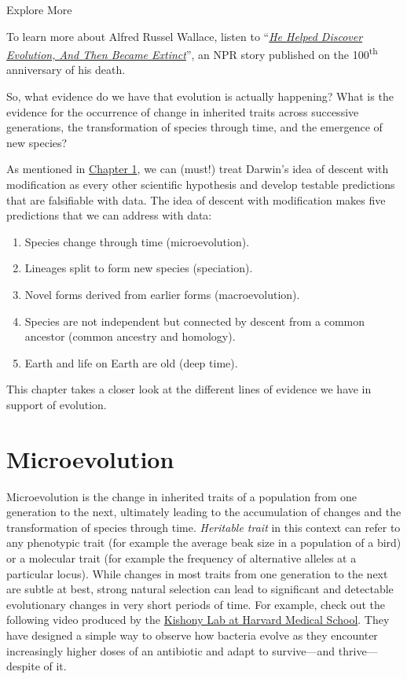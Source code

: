 \documentclass[
]{book}
\providecommand{\tightlist}{%
  \setlength{\itemsep}{0pt}\setlength{\parskip}{0pt}}
\begin{document}
Explore More

To learn more about Alfred Russel Wallace, listen to ``\href{https://www.npr.org/2013/04/30/177781424/he-helped-discover-evolution-and-then-became-extinct}{\emph{He Helped Discover Evolution, And Then Became Extinct}}'', an NPR story published on the 100\textsuperscript{th} anniversary of his death.

So, what evidence do we have that evolution is actually happening? What is the evidence for the occurrence of change in inherited traits across successive generations, the transformation of species through time, and the emergence of new species?

As mentioned in \href{what-evolution-is.html\#predictions}{Chapter 1}, we can (must!) treat Darwin's idea of descent with modification as every other scientific hypothesis and develop testable predictions that are falsifiable with data. The idea of descent with modification makes five predictions that we can address with data:

\begin{enumerate}
\def\labelenumi{\arabic{enumi}.}
\tightlist
\item
  Species change through time (microevolution).
\item
  Lineages split to form new species (speciation).
\item
  Novel forms derived from earlier forms (macroevolution).
\item
  Species are not independent but connected by descent from a common ancestor (common ancestry and homology).
\item
  Earth and life on Earth are old (deep time).
\end{enumerate}

This chapter takes a closer look at the different lines of evidence we have in support of evolution.

\hypertarget{microevolution}{%
\section{Microevolution}\label{microevolution}}

Microevolution is the change in inherited traits of a population from one generation to the next, ultimately leading to the accumulation of changes and the transformation of species through time. \emph{Heritable trait} in this context can refer to any phenotypic trait (for example the average beak size in a population of a bird) or a molecular trait (for example the frequency of alternative alleles at a particular locus). While changes in most traits from one generation to the next are subtle at best, strong natural selection can lead to significant and detectable evolutionary changes in very short periods of time. For example, check out the following video produced by the \href{https://kishony.technion.ac.il/}{Kishony Lab at Harvard Medical School}. They have designed a simple way to observe how bacteria evolve as they encounter increasingly higher doses of an antibiotic and adapt to survive---and thrive---despite of it.
\end{document}
